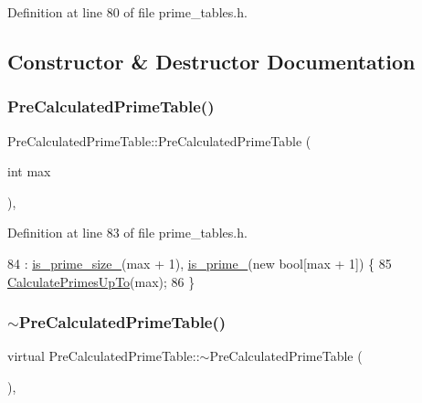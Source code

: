 Definition at line 80 of file prime\+\_\+tables.\+h.



\subsection{Constructor \& Destructor Documentation}
\mbox{\label{classPreCalculatedPrimeTable_a6bb947504421e31da70d2c71576be350}} 
\subsubsection{\texorpdfstring{Pre\+Calculated\+Prime\+Table()}{PreCalculatedPrimeTable()}}
{\footnotesize\ttfamily Pre\+Calculated\+Prime\+Table\+::\+Pre\+Calculated\+Prime\+Table (\begin{DoxyParamCaption}\item[{int}]{max }\end{DoxyParamCaption})\hspace{0.3cm}{\ttfamily [inline]}, {\ttfamily [explicit]}}



Definition at line 83 of file prime\+\_\+tables.\+h.


\begin{DoxyCode}
84       : \hyperlink{classPreCalculatedPrimeTable_ad4275df41c5e5be3cad8c5abeaad1ac6}{is\_prime\_size\_}(max + 1), \hyperlink{classPreCalculatedPrimeTable_ac393ebf41a32b3cba39fe67f7aa5fa38}{is\_prime\_}(\textcolor{keyword}{new} \textcolor{keywordtype}{bool}[max + 1]) \{
85     \hyperlink{classPreCalculatedPrimeTable_a393cb4947a57da9442e435eeff168b76}{CalculatePrimesUpTo}(max);
86   \}
\end{DoxyCode}
\mbox{\label{classPreCalculatedPrimeTable_a6ceab295f80dbe2766b8d4f54138bbc4}} 
\subsubsection{\texorpdfstring{$\sim$\+Pre\+Calculated\+Prime\+Table()}{~PreCalculatedPrimeTable()}}
{\footnotesize\ttfamily virtual Pre\+Calculated\+Prime\+Table\+::$\sim$\+Pre\+Calculated\+Prime\+Table (\begin{DoxyParamCaption}{ }\end{DoxyParamCaption})\hspace{0.3cm}{\ttfamily [inline]}, {\ttfamily [virtual]}}



